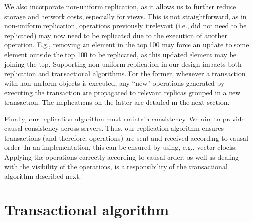 We also incorporate non-uniform replication, as it allows us to further reduce storage and network costs, especially for views.
This is not straightforward, as in non-uniform replication,
operations previously irrelevant (i.e., did not need to be replicated) may now need to be replicated due to the execution of another operation.
E.g., removing an element in the top 100 may force an update to some element outside the top 100 to be replicated, as this updated element may be joining the top.
Supporting non-uniform replication in our design impacts both replication and transactional algorithms.
For the former, whenever a transaction with non-uniform objects is executed, any ``new'' operations generated by executing the transaction are propagated to relevant replicas grouped in a new transaction.
The implications on the latter are detailed in the next section.

Finally, our replication algorithm must maintain consistency.
We aim to provide causal consistency across servers.
Thus, our replication algorithm ensures transactions (and therefore, operations) are sent and received according to causal order.
In an implementation, this can be ensured by using, e.g., vector clocks.
Applying the operations correctly according to causal order, as well as dealing with the visibility of the operations, is a responsibility of the transactional algorithm described next.

\section{Transactional algorithm}
\label{sec:transactional_algorithm}

